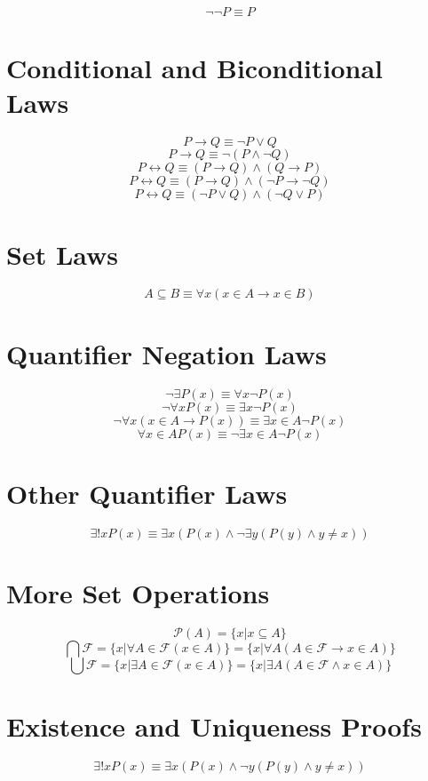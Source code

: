 \documentclass[11pt]{article}
\newcommand{\then}{\rightarrow}
\newcommand{\bicond}{\leftrightarrow}
\newcommand{\powerset}[1]{\mathscr{P}(#1)}
\newcommand{\family}{\mathcal{F}}
\begin{document}
$$\neg \neg P \equiv P$$

\section{Conditional and Biconditional Laws}

$$P \then Q \equiv \neg P \vee Q$$
$$P \then Q \equiv \neg (P \wedge \neg Q)$$
$$P \bicond Q \equiv (P \then Q) \wedge (Q \then P)$$
$$P \bicond Q \equiv (P \then Q) \wedge (\neg P \then \neg Q)$$
$$P \bicond Q \equiv (\neg P \vee Q) \wedge (\neg Q \vee P)$$

\section{Set Laws}
$$A \subseteq B \equiv \forall x (x \in A \then x \in B)$$

\section{Quantifier Negation Laws}

$$\neg \exists P(x) \equiv \forall x \neg P(x)$$
$$\neg \forall x P(x) \equiv \exists x \neg P(x)$$
$$\neg \forall x (x \in A \then P(x)) \equiv \exists x \in A \neg P(x)$$
$$\forall x \in A P(x) \equiv \neg \exists x \in A \neg P(x)$$

\section{Other Quantifier Laws}

$$\exists! x P(x) \equiv \exists x (P(x) \wedge \neg \exists y (P(y) \wedge y \neq x))$$

\section{More Set Operations}

$$\powerset{A} = \{x | x \subseteq A\}$$
$$\bigcap \family = \{x | \forall A \in \family (x \in A)\} = \{x | \forall A (A \in \family \then x \in A)\}$$
$$\bigcup \family = \{x | \exists A \in \family (x \in A)\} = \{x | \exists A (A \in \family \wedge x \in A)\}$$


\section{Existence and Uniqueness Proofs}

$$\exists! x P(x) \equiv \exists x (P(x) \wedge \neg y (P(y) \wedge y \neq x))$$
\end{document}
